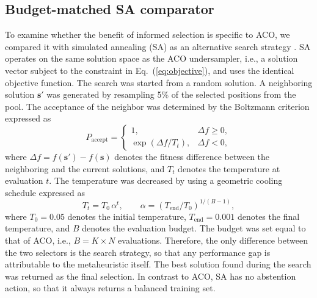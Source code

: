 \documentclass[10pt,a4paper]{article}
\begin{document}
\subsection{Budget-matched SA comparator}
\label{sec:sa}
To examine whether the benefit of informed selection is specific to ACO,
we compared it with simulated annealing (SA) as an alternative search
strategy \citep{kirkpatrick1983optimization, chennuru2022simulated}. SA
operates on the same solution space as the ACO undersampler, i.e., a
solution vector subject to the constraint in Eq.~(\ref{eq:objective}),
and uses the identical objective function. The search was started from a
random solution. A neighboring solution $\mathbf{s}'$ was generated by
resampling 5\% of the selected positions from the pool. The acceptance
of the neighbor was determined by the Boltzmann criterion expressed as
\begin{equation}
  P_{\mathrm{accept}} =
  \begin{cases}
    1, & \Delta f \geq 0,\\[2pt]
    \exp\!\left(\Delta f / T_t\right), & \Delta f < 0,
  \end{cases}
  \label{eq:boltzmann}
\end{equation}
where $\Delta f = f(\mathbf{s}') - f(\mathbf{s})$ denotes the fitness
difference between the neighboring and the current solutions, and $T_t$
denotes the temperature at evaluation $t$. The temperature was decreased
by using a geometric cooling schedule expressed as
\begin{equation}
  T_t = T_0\,\alpha^{t},
  \qquad
  \alpha = \left(T_{\mathrm{end}}/T_0\right)^{1/(B-1)},
  \label{eq:cooling}
\end{equation}
where $T_0 = 0.05$ denotes the initial temperature, $T_{\mathrm{end}} =
0.001$ denotes the final temperature, and $B$ denotes the evaluation
budget. The budget was set equal to that of ACO, i.e., $B = K \times N$
evaluations. Therefore, the only
difference between the two selectors is the search strategy, so that any
performance gap is attributable to the metaheuristic itself. The best
solution found during the search was returned as the final selection. In
contrast to ACO, SA has no abstention action, so that it always returns
a balanced training set.
\end{document}
